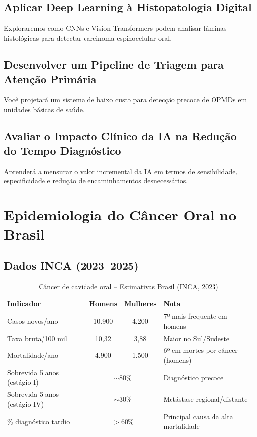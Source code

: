 \subsection{Aplicar Deep Learning à Histopatologia Digital}
Exploraremos como CNNs e Vision Transformers podem analisar lâminas histológicas para detectar carcinoma espinocelular oral.

\subsection{Desenvolver um Pipeline de Triagem para Atenção Primária}
Você projetará um sistema de baixo custo para detecção precoce de OPMDs em unidades básicas de saúde.

\subsection{Avaliar o Impacto Clínico da IA na Redução do Tempo Diagnóstico}
Aprenderá a mensurar o valor incremental da IA em termos de sensibilidade, especificidade e redução de encaminhamentos desnecessários.

\section{Epidemiologia do Câncer Oral no Brasil}
\label{sec:epidemiologia}

\subsection{Dados INCA (2023--2025)}

\begin{table}[H]
  \centering
  \caption{Câncer de cavidade oral -- Estimativas Brasil (INCA, 2023)}
  \label{tab:inca-oral}
  \begin{tabularx}{\textwidth}{lccX}
    \toprule
    \textbf{Indicador} & \textbf{Homens} & \textbf{Mulheres} & \textbf{Nota} \\
    \midrule
    Casos novos/ano & 10.900 & 4.200 & 7º mais frequente em homens \\
    Taxa bruta/100 mil & 10,32 & 3,88 & Maior no Sul/Sudeste \\
    Mortalidade/ano & 4.900 & 1.500 & 6º em mortes por câncer (homens) \\
    Sobrevida 5 anos (estágio I) & \multicolumn{2}{c}{$\sim$80\%} & Diagnóstico precoce \\
    Sobrevida 5 anos (estágio IV) & \multicolumn{2}{c}{$\sim$30\%} & Metástase regional/distante \\
    \% diagnóstico tardio & \multicolumn{2}{c}{$> 60\%$} & Principal causa da alta mortalidade \\
    \bottomrule
  \end{tabularx}
\end{table}

